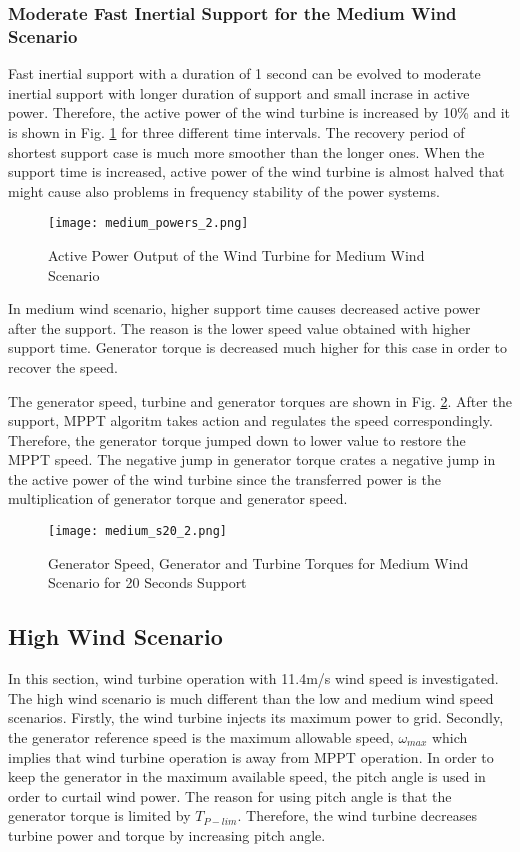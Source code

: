 \subsubsection{Moderate Fast Inertial Support for the Medium Wind Scenario}
Fast inertial support with a duration of 1 second can be evolved to moderate inertial support with longer duration of support and small incrase in active power. Therefore, the active power of the wind turbine is increased by 10\% and it is shown in Fig. \ref{midpowers} for three different time intervals. The recovery period of shortest support case is much more smoother than the longer ones. When the support time is increased, active power of the wind turbine is almost halved that might cause also problems in frequency stability of the power systems. \par
\begin{figure}[h!]
	\centering
	\texttt{[image: medium\_powers\_2.png]}
	\caption{Active Power Output of the Wind Turbine for Medium Wind Scenario}
	\label{midpowers}
\end{figure}
In medium wind scenario, higher support time causes decreased active power after the support. The reason is the lower speed value obtained with higher support time. Generator torque is decreased much higher for this case in order to recover the speed. \par
The generator speed, turbine and generator torques are shown in Fig. \ref{mid_torques3}. After the support, MPPT algoritm takes action and regulates the speed correspondingly. Therefore, the generator torque jumped down to lower value to restore the MPPT speed. The negative jump in generator torque crates a negative jump in the active power of the wind turbine since the transferred power is the multiplication of generator torque and generator speed.\par
\begin{figure}[h!]
	\centering
	\texttt{[image: medium\_s20\_2.png]}
	\caption{Generator Speed, Generator and Turbine Torques for Medium Wind Scenario for 20 Seconds Support}
	\label{mid_torques3}
\end{figure}
\subsection{High Wind Scenario}
In this section, wind turbine operation with 11.4m/s wind speed is investigated. The high wind scenario is much different than the low and medium wind speed scenarios. Firstly, the wind turbine injects its maximum power to grid. Secondly, the generator reference speed is the maximum allowable speed, $\omega_{max}$ which implies that wind turbine operation is away from MPPT operation. In order to keep the generator in the maximum available speed, the pitch angle is used in order to curtail wind power. The reason for using pitch angle is that the generator torque is limited by $T_{P-lim}$. Therefore, the wind turbine decreases turbine power and torque by increasing pitch angle.\par

